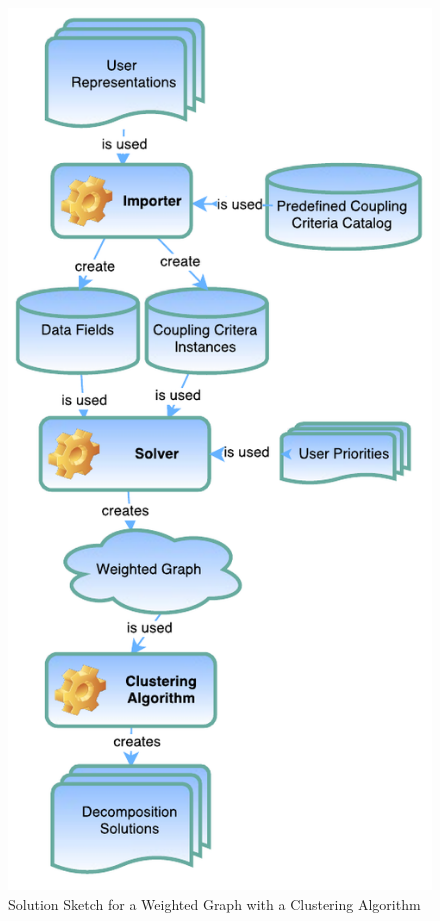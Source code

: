 \begin{minipage}[t]{0.5\textwidth}
	\begin{figure}[H]
		\includegraphics[scale=1.0]{diagrams/graph_approach.pdf}
		\caption{Solution Sketch for a Weighted Graph with a Clustering Algorithm}
		\label{fig:graph_approach}
	\end{figure}
\end{minipage}


